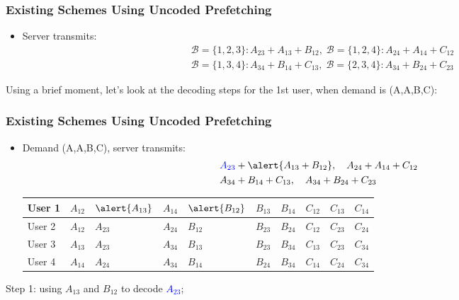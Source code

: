 \documentclass{beamer}
\begin{document}
\begin{frame}
\frametitle{Existing Schemes Using Uncoded Prefetching}
\begin{itemize}
\item Server transmits:
\begin{align*}
& \mathcal{B}=\{1,2,3\}:A_{23} +A_{13}+B_{12}, \;  \mathcal{B}=\{1,2,4\}:A_{24} +A_{14}+C_{12} \\
& \mathcal{B}=\{1,3,4\}:A_{34} +B_{14}+C_{13} ,\;  \mathcal{B}=\{2,3,4\}:A_{34} +B_{24}+C_{23}
\end{align*}
\end{itemize}
Using a brief moment, let's look at the decoding steps for the 1st user, when demand is (A,A,B,C):
\end{frame}

\begin{frame}
\frametitle{Existing Schemes Using Uncoded Prefetching}
\begin{itemize}
\item Demand (A,A,B,C), server transmits:
\begin{align*}
& \textcolor{blue}{A_{23}} +\alert{A_{13}+B_{12}}, \quad  A_{24} +A_{14}+C_{12} \\
& A_{34} +B_{14}+C_{13} ,\quad  A_{34} +B_{24}+C_{23}
\end{align*}
\begin{table}[]
\centering
\begin{tabular}{|l||l|l|l|l|l|l|l|l|l|}
\hline
User 1 & $A_{12}$ & $\alert{A_{13}}$ & $A_{14}$ & $\alert{B_{12}}$ & $B_{13}$ & $B_{14}$ & $C_{12}$ & $C_{13}$ & $C_{14}$ \\ \hline
User 2 & $A_{12}$ & $A_{23}$ & $A_{24}$ & $B_{12}$ & $B_{23}$ & $B_{24}$ & $C_{12}$ & $C_{23}$ & $C_{24}$ \\ \hline
User 3 & $A_{13}$ & $A_{23}$ & $A_{34}$ & $B_{13}$ & $B_{23}$ & $B_{34}$ & $C_{13}$ & $C_{23}$ & $C_{34}$ \\ \hline
User 4 & $A_{14}$ & $A_{24}$ & $A_{34}$ & $B_{14}$ & $B_{24}$ & $B_{34}$ & $C_{14}$ & $C_{24}$ & $C_{34}$ \\ \hline
\end{tabular}
\end{table}
\end{itemize}
Step 1: using \alert{$A_{13}$} and \alert{$B_{12}$} to decode \textcolor{blue}{$A_{23}$};
\end{frame}
\end{document}
